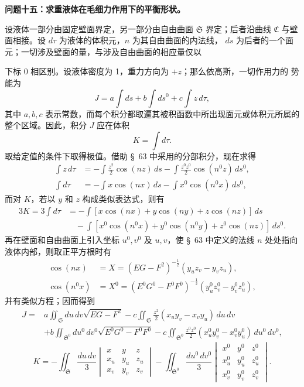 \documentclass[11pt,a4paper,leqno]{article}
\begin{document}
\begin{center}
\textbf{问题十五：求重液体在毛细力作用下的平衡形状。}
\end{center}

设液体一部分由固定壁面界定，另一部分由自由曲面 $\mathfrak{S}$ 界定；后者沿曲线
$\mathfrak{C}$ 与壁面相接。设 $d\tau$ 为液体的体积元，$n$ 为其自由曲面的内法线，
$ds$ 为后者的一个面元；一切涉及壁面的量，与涉及自由曲面的相应量仅以

下标 0 相区别。设液体密度为 1，重力方向为 $+z$；那么依高斯，一切作用力的
势能为
\[
J=a\int ds+b\int ds^0+c\int z\,d\tau,
\]
其中 $a,b,c$ 表示常数，而每个积分都取遍其被积函数中所出现面元或体积元所属的
整个区域。因此，积分 $J$ 应在体积
\[
K=\int d\tau.
\]
取给定值的条件下取得极值。借助 \S~63 中采用的分部积分，现在求得
\[
\begin{aligned}
\int z\,d\tau
&=-\int\frac{z^2}{2}\cos(nz)\,ds
-\int\frac{z^0z^0}{2}\cos(n^0z)\,ds^0,\\
\int d\tau
&=-\int x\cos(nx)\,ds
-\int x^0\cos(n^0x)\,ds^0,
\end{aligned}
\]
而对 $K$，若以 $y$ 和 $z$ 构成类似表达式，则有
\[
\begin{aligned}
3K=3\int d\tau
&=-\int[x\cos(nx)+y\cos(ny)+z\cos(nz)]\,ds\\
&\quad-\int[x^0\cos(n^0x)+y^0\cos(n^0y)+z^0\cos(nz)]\,ds^0.
\end{aligned}
\]
再在壁面和自由曲面上引入坐标 $u^0,v^0$ 及 $u,v$，使 \S~63 中定义的法线
$n$ 处处指向液体内部，则取正平方根时有
\[
\begin{aligned}
\cos(nx)&=X=(EG-F^2)^{-\frac12}(y_uz_v-y_vz_u),\\
\cos(n^0x)&=X^0=(E^0G^0-F^0F^0)^{-\frac12}
(y_u^0z_v^0-y_v^0z_u^0),
\end{aligned}
\]
并有类似方程；因而得到
\[
\begin{aligned}
J={}&a\iint_{\mathfrak{S}}du\,dv\sqrt{EG-F^2}
-c\iint_{\mathfrak{S}}\frac{z^2}{2}(x_uy_v-x_vy_u)\,du\,dv\\
&+b\iint_{\mathfrak{S}^0}du^0\,dv^0\sqrt{E^0G^0-F^0F^0}
-c\iint_{\mathfrak{S}^0}\frac{z^0z^0}{2}
(x_u^0y_v^0-x_v^0y_u^0)\,du^0\,dv^0,
\end{aligned}
\]
\[
K=-\iint_{\mathfrak{S}}\frac{du\,dv}{3}
\begin{vmatrix}
x&y&z\\x_u&y_u&z_u\\x_v&y_v&z_v
\end{vmatrix}
-\iint_{\mathfrak{S}^0}\frac{du^0\,dv^0}{3}
\begin{vmatrix}
x^0&y^0&z^0\\x_u^0&y_u^0&z_u^0\\x_v^0&y_v^0&z_v^0
\end{vmatrix}.
\]
\end{document}
